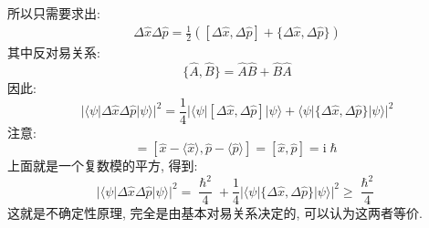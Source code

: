         所以只需要求出: 
        \begin{equation}\begin{aligned}
            \Delta \hat{x} \Delta \hat{p} = \frac 12([\Delta \hat{x}, \Delta \hat{p}] + \{\Delta \hat{x}, \Delta \hat{p}\})
        \end{aligned}\end{equation}
        其中反对易关系: 
        \begin{equation}
            \{\hat{A}, \hat{B}\} = \hat{A}\hat{B} + \hat{B}\hat{A}
        \end{equation}
        因此: 
        \begin{equation}
            |\langle \psi |\Delta \hat{x} \Delta \hat{p}|\psi \rangle|^2 = \frac 14 |\langle \psi |[\Delta \hat{x},\Delta \hat{p}]|\psi \rangle + \langle \psi |\{\Delta \hat{x},\Delta \hat{p}\}|\psi \rangle|^2
        \end{equation}
        注意: 
        \begin{equation}
            [\Delta \hat{x},\Delta \hat{p}] = [\hat{x}-\langle \hat{x} \rangle, \hat{p}-\langle \hat{p} \rangle ] = [\hat{x},\hat{p}] = \mathrm{i}\hslash
        \end{equation}
        上面就是一个复数模的平方, 得到: 
        \begin{equation}
            |\langle \psi |\Delta \hat{x} \Delta \hat{p}|\psi \rangle|^2 = \frac {\hslash^2}4 + \frac 14 |\langle \psi |\{\Delta \hat{x},\Delta \hat{p}\}|\psi \rangle|^2 \geqslant \frac {\hslash^2}4
        \end{equation}
        这就是不确定性原理, 完全是由基本对易关系决定的, 可以认为这两者等价.

